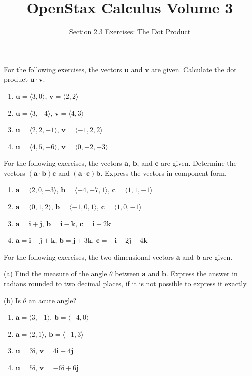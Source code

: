 \documentclass{exercises}
\title{OpenStax Calculus Volume 3}
\subtitle{Section 2.3 Exercises: The Dot Product}
\author{}
\date{}
\begin{document}
\maketitle


For the following exercises, the vectors $\mathbf{u}$ and $\mathbf{v}$ are given. Calculate the dot product $\mathbf{u}\cdot \mathbf{v}$.

\begin{enumerate}[start=1]
\item $\mathbf{u}=\langle3,0\rangle$, $\mathbf{v}=\langle2,2\rangle$
\item $\mathbf{u}=\langle3,-4\rangle$, $\mathbf{v}=\langle4,3\rangle$
\item $\mathbf{u}=\langle2,2,-1\rangle$, $\mathbf{v}=\langle-1,2,2\rangle$
\item $\mathbf{u}=\langle4,5,-6\rangle$, $\mathbf{v}=\langle0,-2,-3\rangle$
\end{enumerate}

For the following exercises, the vectors $\mathbf{a}$, $\mathbf{b}$, and $\mathbf{c}$ are given. Determine the vectors $(\mathbf{a}\cdot \mathbf{b})\mathbf{c}$ and $(\mathbf{a}\cdot \mathbf{c})\mathbf{b}$. Express the vectors in component form.

\begin{enumerate}[resume]
\item $\mathbf{a}=\langle2,0,-3\rangle$, $\mathbf{b}=\langle-4,-7,1\rangle$, $\mathbf{c}=\langle1,1,-1\rangle$
\item $\mathbf{a}=\langle0,1,2\rangle$, $\mathbf{b}=\langle-1,0,1\rangle$, $\mathbf{c}=\langle1,0,-1\rangle$
\item $\mathbf{a}=\mathbf{i}+\mathbf{j}$, $\mathbf{b}=\mathbf{i}-\mathbf{k}$, $\mathbf{c}=\mathbf{i}-2\mathbf{k}$
\item $\mathbf{a}=\mathbf{i}-\mathbf{j}+\mathbf{k}$, $\mathbf{b}=\mathbf{j}+3\mathbf{k}$, $\mathbf{c}=-\mathbf{i}+2\mathbf{j}-4\mathbf{k}$
\end{enumerate}

For the following exercises, the two-dimensional vectors $\mathbf{a}$ and $\mathbf{b}$ are given.


(a) Find the measure of the angle $\theta$ between $\mathbf{a}$ and $\mathbf{b}$. Express the answer in radians rounded to two decimal places, if it is not possible to express it exactly.


(b) Is $\theta$ an acute angle?

\begin{enumerate}[resume]
\item \techrequired $\mathbf{a}=\langle3,-1\rangle$, $\mathbf{b}=\langle-4,0\rangle$
\item \techrequired $\mathbf{a}=\langle2,1\rangle$, $\mathbf{b}=\langle-1,3\rangle$
\item $\mathbf{u}=3\mathbf{i}$, $\mathbf{v}=4\mathbf{i}+4\mathbf{j}$
\item $\mathbf{u}=5\mathbf{i}$, $\mathbf{v}=-6\mathbf{i}+6\mathbf{j}$
\end{enumerate}
\end{document}
